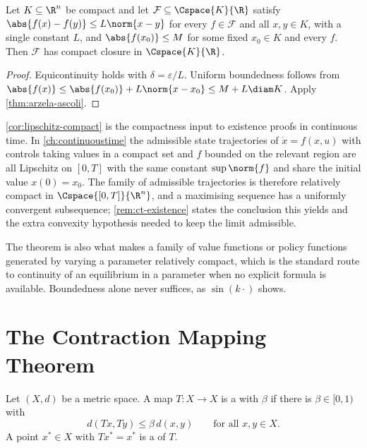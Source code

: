 \begin{corollary}\label{cor:lipschitz-compact}
	Let $K\subseteq\R^n$ be compact and let $\mathcal{F}\subseteq\Cspace{K}{\R}$
	satisfy $\abs{f(x)-f(y)}\leq L\norm{x-y}$ for every $f\in\mathcal{F}$ and all
	$x,y\in K$, with a single constant $L$, and $\abs{f(x_0)}\leq M$ for some fixed
	$x_0\in K$ and every $f$. Then $\mathcal{F}$ has compact closure in
	$\Cspace{K}{\R}$.
\end{corollary}

\begin{proof}
	Equicontinuity holds with $\delta=\varepsilon/L$. Uniform boundedness follows
	from $\abs{f(x)}\leq\abs{f(x_0)}+L\norm{x-x_0}\leq M+L\diam K$. Apply
	\autoref{thm:arzela-ascoli}.
\end{proof}

\begin{remark}\label{rem:ascoli-uses}
	\autoref{cor:lipschitz-compact} is the compactness input to existence proofs in
	continuous time. In \autoref{ch:continuoustime} the admissible state
	trajectories of $\dot x=f(x,u)$ with controls taking values in a compact set
	and $f$ bounded on the relevant region are all Lipschitz on $[0,T]$ with the
	same constant $\sup\norm{f}$ and share the initial value $x(0)=x_0$. The family
	of admissible trajectories is therefore relatively compact in
	$\Cspace{[0,T]}{\R^{n}}$, and a maximising sequence has a uniformly convergent
	subsequence; \autoref{rem:ct-existence} states the conclusion this yields and
	the extra convexity hypothesis needed to keep the limit admissible.

	The theorem is also what makes a family of value functions or policy functions
	generated by varying a parameter relatively compact, which is the standard route
	to continuity of an equilibrium in a parameter when no explicit formula is
	available. Boundedness alone never suffices, as $\sin(k\cdot)$ shows.
\end{remark}

\section{The Contraction Mapping Theorem}\label{sec:comp-contraction}

\begin{definition}[Contraction]\label{def:contraction}
	Let $(X,d)$ be a metric space. A map $T\colon X\to X$ is a
	 with  $\beta$ if there is
	$\beta\in[0,1)$ with
	\[
		d(Tx,Ty)\leq\beta\,d(x,y)\qquad\text{for all }x,y\in X .
	\]
	A point $x^\ast\in X$ with $Tx^\ast=x^\ast$ is a  of $T$.
\end{definition}

